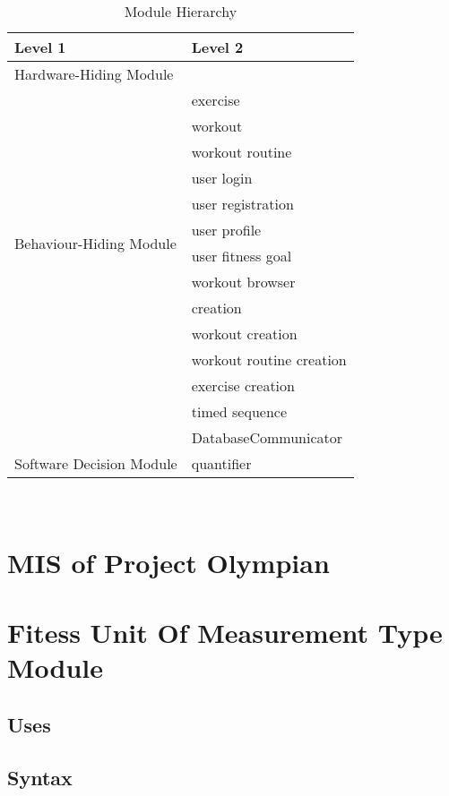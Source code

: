 \documentclass[12pt, titlepage]{article}
\begin{document}
\begin{table}[h!]
	\centering
	\begin{tabular}{p{} p{}}
		\toprule
		\textbf{Level 1} & \textbf{Level 2}\\
		\midrule
		
		{Hardware-Hiding Module} & ~ \\
		\midrule
		
		\multirow{12}{0.3\textwidth}{Behaviour-Hiding Module}
		& exercise\\
		& workout\\
		& workout routine\\
		& user login\\
		& user registration\\
		& user profile\\ 
		& user fitness goal\\
		& workout browser\\
		& creation\\
		& workout creation\\
		& workout routine creation\\
		& exercise creation\\
		& timed sequence\\
		& DatabaseCommunicator\\
		\midrule
		
		\multirow{1}{0.3\textwidth}{Software Decision Module}
		& quantifier\\
		\bottomrule
		
	\end{tabular}
	\caption{Module Hierarchy}
	\label{TblMH}
\end{table}

\newpage
~\newpage

\section{MIS of Project Olympian} \label{Template} 

\section{Fitess Unit Of Measurement Type Module}

\subsection{Uses}

\subsection{Syntax}
\end{document}
